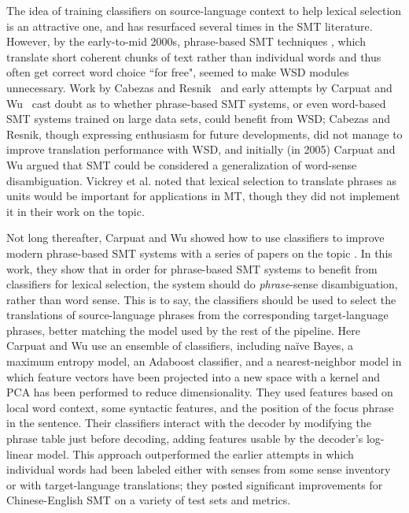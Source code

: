 The idea of training classifiers on source-language context to help lexical
selection is an attractive one, and has resurfaced several times in the SMT
literature. However, by the early-to-mid 2000s, phrase-based SMT techniques
\cite{koehn2003statistical}, which translate short coherent chunks of text
rather than individual words and thus often get correct word choice ``for
free", seemed to make WSD modules unnecessary.
Work by Cabezas and
Resnik~\cite{cabezas2005using} and early attempts by Carpuat and
Wu~\cite{carpuat-wu:2005:ACL} cast doubt as to whether phrase-based SMT
systems, or even word-based SMT systems trained on large data sets, could
benefit from WSD; Cabezas and Resnik, though expressing enthusiasm for future
developments, did not manage to improve translation performance with WSD, and
initially (in 2005) Carpuat and Wu argued that SMT could be considered a
generalization of word-sense disambiguation. Vickrey et al.
\cite{vickrey-EtAl:2005:HLTEMNLP} noted that lexical selection to translate
phrases as units would be important for applications in MT, though they did not
implement it in their work on the topic.

Not long thereafter, Carpuat and Wu showed how to use classifiers to
improve modern phrase-based SMT systems with a series of papers on the topic
\cite{carpuatpsd,carpuat-wu:2007:EMNLP-CoNLL2007,carpuat2008evaluation,improvingsmtwsd}.
In this work, they show that in order for phrase-based SMT systems to benefit
from classifiers for lexical selection, the system should do
\emph{phrase}-sense disambiguation, rather than word sense. This is to say, the
classifiers should be used to select the translations of source-language
phrases from the corresponding target-language phrases, better matching the
model used by the rest of the pipeline.
Here Carpuat and Wu use an ensemble of classifiers, including naïve Bayes, a
maximum entropy model, an Adaboost classifier, and a nearest-neighbor model in
which feature vectors have been projected into a new space with a kernel and
PCA has been performed to reduce dimensionality.
They used features based on local word context, some syntactic features, and
the position of the focus phrase in the sentence. Their classifiers interact
with the decoder by modifying the phrase table just before decoding, adding
features usable by the decoder's log-linear model.
This approach outperformed the earlier attempts in which individual words had
been labeled either with senses from some sense inventory or with
target-language translations; they posted significant improvements for
Chinese-English SMT on a variety of test sets and metrics.

